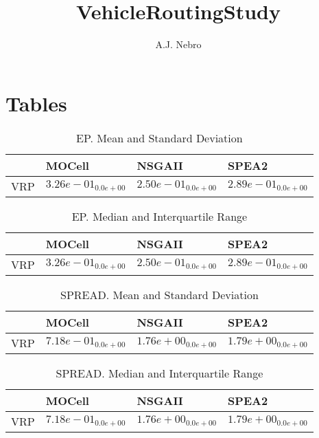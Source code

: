 \documentclass{article}
\title{VehicleRoutingStudy}
\author{A.J. Nebro}
\begin{document}
\maketitle
\section{Tables}

\begin{table}
\caption{EP. Mean and Standard Deviation}
\label{table: EP}
\centering
\begin{scriptsize}
\begin{tabular}{llll}
\hline & MOCell & NSGAII &  SPEA2\\
\hline 
VRP & $  3.26e-01_{ 0.0e+00}$ & \cellcolor{gray95}$  2.50e-01_{ 0.0e+00}$ & \cellcolor{gray25}$  2.89e-01_{ 0.0e+00}$ \\
\hline
\end{tabular}
\end{scriptsize}
\end{table}

\begin{table}
\caption{EP. Median and Interquartile Range}
\label{table: EP}
\centering
\begin{scriptsize}
\begin{tabular}{llll}
\hline & MOCell & NSGAII &  SPEA2\\
\hline 
VRP & $  3.26e-01_{ 0.0e+00}$ & \cellcolor{gray95}$  2.50e-01_{ 0.0e+00}$ & \cellcolor{gray25}$  2.89e-01_{ 0.0e+00}$ \\
\hline
\end{tabular}
\end{scriptsize}
\end{table}

\begin{table}
\caption{SPREAD. Mean and Standard Deviation}
\label{table: SPREAD}
\centering
\begin{scriptsize}
\begin{tabular}{llll}
\hline & MOCell & NSGAII &  SPEA2\\
\hline 
VRP & \cellcolor{gray95}$  7.18e-01_{ 0.0e+00}$ & \cellcolor{gray25}$  1.76e+00_{ 0.0e+00}$ & $  1.79e+00_{ 0.0e+00}$ \\
\hline
\end{tabular}
\end{scriptsize}
\end{table}

\begin{table}
\caption{SPREAD. Median and Interquartile Range}
\label{table: SPREAD}
\centering
\begin{scriptsize}
\begin{tabular}{llll}
\hline & MOCell & NSGAII &  SPEA2\\
\hline 
VRP & \cellcolor{gray95}$  7.18e-01_{ 0.0e+00}$ & \cellcolor{gray25}$  1.76e+00_{ 0.0e+00}$ & $  1.79e+00_{ 0.0e+00}$ \\
\hline
\end{tabular}
\end{scriptsize}
\end{table}
\end{document}
